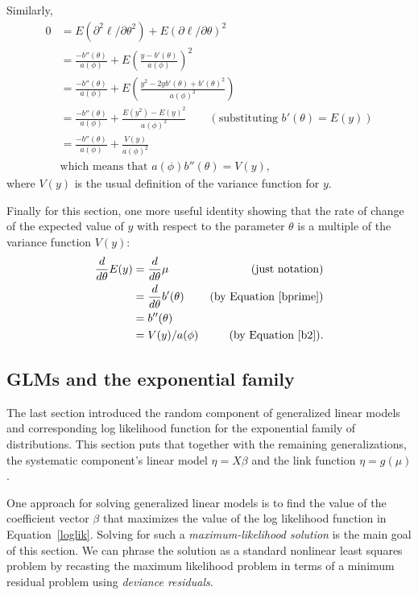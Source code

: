 \documentclass[10pt]{article} %
\begin{document}
Similarly,
\begin{align}
0 &= 
E(\partial^2\ell/\partial\theta^2) + E(\partial\ell/\partial\theta)^2 \nonumber\\
&=
\frac{-b''(\theta)}{a(\phi)} +
E\left(\frac{y - b'(\theta)}{a(\phi)}\right)^2 \nonumber\\
&= \frac{-b''(\theta)}{a(\phi)} +
E\left(\frac{y^2 - 2yb'(\theta) + b'(\theta)^2}{a(\phi)^2}\right)\nonumber\\
&= \frac{-b''(\theta)}{a(\phi)} +
\frac{E(y^2) - E(y)^2}{a(\phi)^2} \qquad(\mbox{substituting}\,\,b'(\theta)=E(y))\nonumber\\
&= \frac{-b''(\theta)}{a(\phi)} + \frac{V(y)}{a(\phi)^2}\nonumber\\
&\mbox{which means that}\,\,a(\phi)b''(\theta) = V(y)\label{b2},
\end{align}
where $V(y)$ is the usual definition of the variance function for $y$.

Finally for this section, one more useful identity showing that the
rate of change of the expected value of $y$ with respect to the parameter $\theta$
is a multiple of the variance function $V(y)$:
\begin{align}
\frac{d}{d\theta}E(y) &= \frac{d}{d\theta}\mu &\mbox{(just notation)}\nonumber\\
&= \frac{d}{d\theta}b'(\theta) &\mbox{(by Equation \ref{bprime})}\nonumber\\
&= b''(\theta)\nonumber\\
&= V(y)/a(\phi)\label{mutheta} &\mbox{(by Equation \ref{b2})}.
\end{align}





\subsection*{GLMs and the exponential family}

The last section introduced the random component of generalized linear models
and corresponding log likelihood function for the exponential family of
distributions.  This section puts that together with the remaining
generalizations, the systematic component's linear model $\eta = X\beta$ and
the link function $\eta=g(\mu)$.

One approach for solving generalized linear models is to find the value of the
coefficient vector $\beta$ that maximizes the value of the log likelihood
function in Equation~\ref{loglik}.  Solving for such a \emph{maximum-likelihood
solution} is the main goal of this section. We can phrase the solution as a
standard nonlinear least squares problem by recasting the maximum likelihood
problem in terms of a minimum residual problem using \emph{deviance residuals}.
\end{document}
